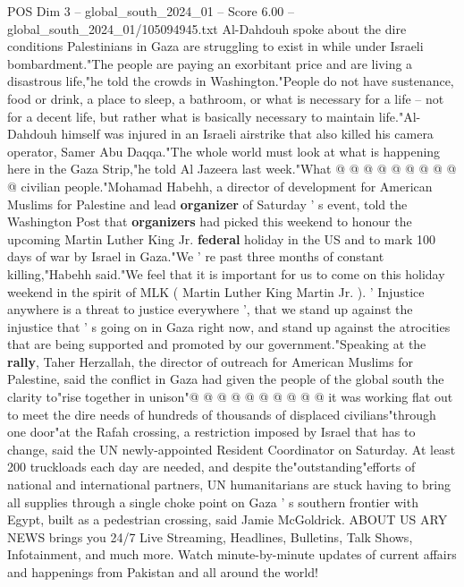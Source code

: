 \begin{textsample}{POS Dim 3 – global\_south\_2024\_01 – Score 6.00 – global\_south\_2024\_01/105094945.txt}
Al-Dahdouh spoke about the dire conditions Palestinians in Gaza are struggling to exist in while under Israeli bombardment."The people are paying an exorbitant price and are living a disastrous life,"he told the crowds in Washington."People do not have sustenance, food or drink, a place to sleep, a bathroom, or what is necessary for a life -- not for a decent life, but rather what is basically necessary to maintain life."Al-Dahdouh himself was injured in an Israeli airstrike that also killed his camera operator, Samer Abu Daqqa."The whole world must look at what is happening here in the Gaza Strip,"he told Al Jazeera last week."What @ @ @ @ @ @ @ @ @ @ civilian people."Mohamad Habehh, a director of development for American Muslims for Palestine and lead \textbf{organizer} of Saturday ' s event, told the Washington Post that \textbf{organizers} had picked this weekend to honour the upcoming Martin Luther King Jr. \textbf{federal} holiday in the US and to mark 100 days of war by Israel in Gaza."We ' re past three months of constant killing,"Habehh said."We feel that it is important for us to come on this holiday weekend in the spirit of MLK ( Martin Luther King Martin Jr. ). ' Injustice anywhere is a threat to justice everywhere ', that we stand up against the injustice that ' s going on in Gaza right now, and stand up against the atrocities that are being supported and promoted by our government."Speaking at the \textbf{rally}, Taher Herzallah, the director of outreach for American Muslims for Palestine, said the conflict in Gaza had given the people of the global south the clarity to"rise together in unison"@ @ @ @ @ @ @ @ @ @ it was working flat out to meet the dire needs of hundreds of thousands of displaced civilians"through one door"at the Rafah crossing, a restriction imposed by Israel that has to change, said the UN newly-appointed Resident Coordinator on Saturday.
At least 200 truckloads each day are needed, and despite the"outstanding"efforts of national and international partners, UN humanitarians are stuck having to bring all supplies through a single choke point on Gaza ' s southern frontier with Egypt, built as a pedestrian crossing, said Jamie McGoldrick.
ABOUT US ARY NEWS brings you 24/7 Live Streaming, Headlines, Bulletins, Talk Shows, Infotainment, and much more.
Watch minute-by-minute updates of current affairs and happenings from Pakistan and all around the world!

\end{textsample}
